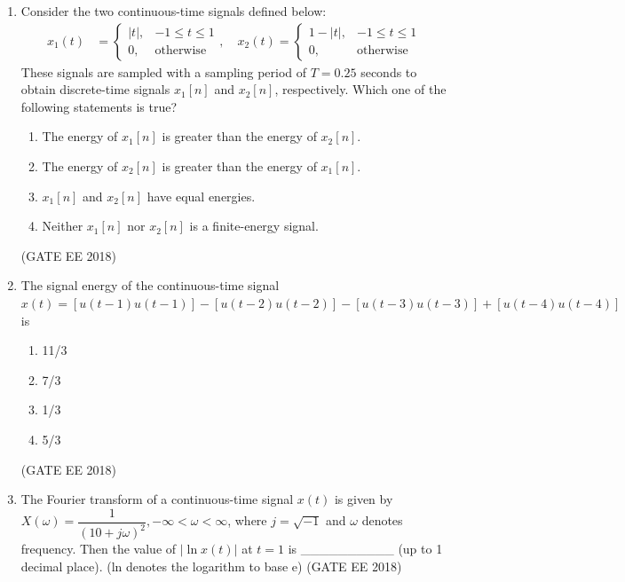 \documentclass[journal,12pt,onecolumn]{IEEEtran}
\theoremstyle{remark}
\begin{document}
\begin{enumerate}
\item Consider the two continuous-time signals defined below:
\begin{align*}
x_1(t) &= \begin{cases} |t|, & -1 \le t \le 1 \\ 0, & \text{otherwise} \end{cases}, \quad
x_2(t) = \begin{cases} 1-|t|, & -1 \le t \le 1 \\ 0, & \text{otherwise} \end{cases}
\end{align*}
These signals are sampled with a sampling period of $T = 0.25$ seconds to obtain discrete-time signals $x_1[n]$ and $x_2[n]$, respectively. Which one of the following statements is true?
\begin{enumerate}
    \item The energy of $x_1[n]$ is greater than the energy of $x_2[n]$.
    \item The energy of $x_2[n]$ is greater than the energy of $x_1[n]$.
    \item $x_1[n]$ and $x_2[n]$ have equal energies.
    \item Neither $x_1[n]$ nor $x_2[n]$ is a finite-energy signal.
\end{enumerate}
\hfill{(GATE EE 2018)}

\item The signal energy of the continuous-time signal $x(t) = [u(t-1)u(t-1)] - [u(t-2)u(t-2)] - [u(t-3)u(t-3)] + [u(t-4)u(t-4)]$ is
\begin{multicols}{4}
\begin{enumerate}
    \item 11/3
    \item 7/3
    \item 1/3
    \item 5/3
\end{enumerate}
\end{multicols}
\hfill{(GATE EE 2018)}

\item The Fourier transform of a continuous-time signal $x(t)$ is given by $X(\omega) = \dfrac{1}{(10+j\omega)^2}, -\infty < \omega < \infty$, where $j = \sqrt{-1}$ and $\omega$ denotes frequency. Then the value of $|\ln x(t)|$ at $t=1$ is \_\_\_\_\_\_\_\_\_\_ (up to 1 decimal place). (ln denotes the logarithm to base e)
\hfill{(GATE EE 2018)}


\end{enumerate}
\end{document}
